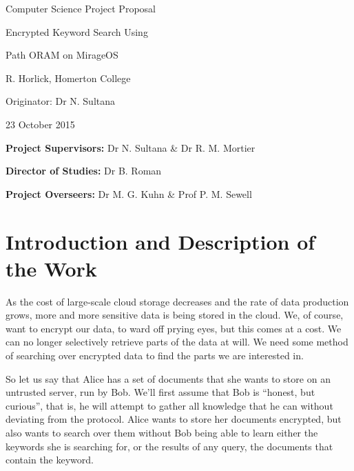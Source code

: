 \documentclass[12pt,a4paper,twoside]{article}
\begin{document}
\vfil

\centerline{\Large Computer Science Project Proposal}
\vspace{0.4in}
\centerline{\Large Encrypted Keyword Search Using}
\vspace{0.05in}
\centerline{\Large Path ORAM on MirageOS}
\vspace{0.4in}
\centerline{\large R. Horlick, Homerton College}
\vspace{0.3in}
\centerline{\large Originator: Dr N. Sultana}
\vspace{0.3in}
\centerline{\large 23 October 2015}

\vfil


\noindent
{\bf Project Supervisors:} Dr N. Sultana \& Dr R. M. Mortier
\vspace{0.2in}

\noindent
{\bf Director of Studies:} Dr B. Roman
\vspace{0.2in}
\noindent
 
\noindent
{\bf Project Overseers:} Dr M. G. Kuhn \& Prof P. M. Sewell



\section*{Introduction and Description of the Work}


As the cost of large-scale cloud storage decreases and the rate of data production grows, more and more sensitive data is being stored in the cloud. We, of course, want to encrypt our data, to ward off prying eyes, but this comes at a cost. We can no longer selectively retrieve parts of the data at will. We need some method of searching over encrypted data to find the parts we are interested in.


So let us say that Alice has a set of documents that she wants to store on an untrusted server, run by Bob. We'll first assume that Bob is ``honest, but curious'', that is, he will attempt to gather all knowledge that he can without deviating from the protocol. Alice wants to store her documents encrypted, but also wants to search over them without Bob being able to learn either the keywords she is searching for, or the results of any query, the documents that contain the keyword.
\end{document}
